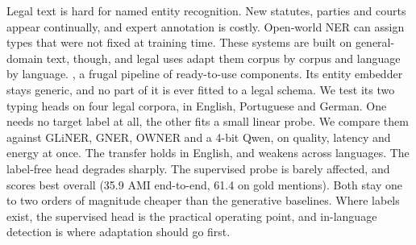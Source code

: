 Legal text is hard for named entity recognition. New statutes, parties and courts appear continually, and expert annotation is costly. Open-world NER can assign types that were not fixed at training time. These systems are built on general-domain text, though, and legal uses adapt them corpus by corpus and language by language. , a frugal pipeline of ready-to-use components. Its entity embedder stays generic, and no part of it is ever fitted to a legal schema. We test its two typing heads on four legal corpora, in English, Portuguese and German. One needs no target label at all, the other fits a small linear probe. We compare them against GLiNER, GNER, OWNER and a 4-bit Qwen, on quality, latency and energy at once. The transfer holds in English, and weakens across languages. The label-free head degrades sharply. The supervised probe is barely affected, and scores best overall (35.9 AMI end-to-end, 61.4 on gold mentions). Both stay one to two orders of magnitude cheaper than the generative baselines.  Where labels exist, the supervised head is the practical operating point, and in-language detection is where adaptation should go first.
